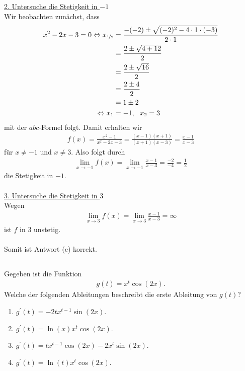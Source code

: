 \underline{2. Untersuche die Stetigkeit in $-1$}\\
Wir beobachten zunächst, dass
\begin{align*}
x^2 -2x -3 = 0
\Leftrightarrow
x_{\nicefrac{1}{2}} &= \frac{-(-2) \pm \sqrt{(-2)^2 - 4\cdot 1 \cdot (-3)}}{2 \cdot 1}\\
&=
\frac{2 \pm \sqrt{4 + 12}}{2}\\
&=
\frac{2 \pm \sqrt{16}}{2}\\
&=
\frac{2 \pm 4}{2} \\
&=
1 \pm 2\\
\Leftrightarrow
x_1 &= -1, \ \ x_2 = 3
\end{align*}
mit der $abc$-Formel folgt.
Damit erhalten wir
\begin{align*}
f(x) = \frac{x^2 -1}{x^2 -2x -3}
= \frac{(x-1) (x+1)}{(x+1)(x-3)}
= \frac{x-1}{x-3}
\end{align*}
für $x \neq -1$ und $x \neq 3$.
Also folgt durch
\begin{align*}
\lim \limits_{x \rightarrow -1} f(x)
=
\lim \limits_{x \rightarrow -1} \frac{x-1}{x-3}
= 
\frac{-2}{-4}
= 
\frac{1}{2}
\end{align*}
die Stetigkeit in $-1$.
\\
\\
\underline{3. Untersuche die Stetigkeit in $3$}\\
Wegen 
\begin{align*}
\lim \limits_{x \rightarrow 3} f(x)
= 
\lim \limits_{x \rightarrow 3} \frac{x-1}{x-3}
=
\infty
\end{align*}
ist $f$ in $3$ unstetig.\\
\\
Somit ist Antwort (c) korrekt.

\newpage

\subsection*{}
Gegeben ist die Funktion
\begin{align*}
g(t) = x^t  \cos(2x).
\end{align*}
Welche der folgenden Ableitungen beschreibt die erste Ableitung von $g(t)$?
\renewcommand{\labelenumi}{(\alph{enumi})}
\begin{enumerate}
\item $g^\prime(t) = -2  t  x^{t-1}  \sin(2x)$.
\item $g^\prime(t) = \ln(x)   x^t  \cos(2x) $.
\item $g^\prime(t) = t  x^{t-1}  \cos(2x) - 2 x^t  \sin(2x)$.
\item $g^\prime(t) = \ln(t)  x^t  \cos(2x)$.
\end{enumerate}

